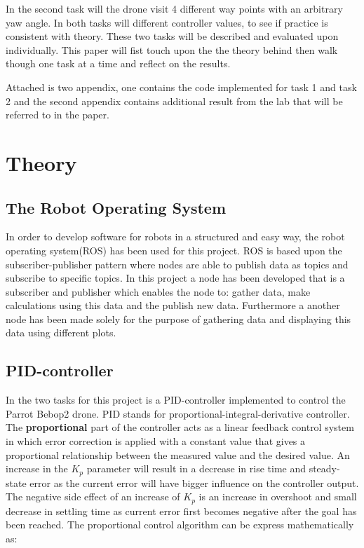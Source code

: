 \documentclass[conference]{IEEEtran}
\begin{document}
In the second task will the drone visit 4 different way points with an arbitrary yaw angle.  
In both tasks will different controller values, to see if practice is consistent with theory. These two tasks will be described and evaluated upon individually. This paper will fist touch upon the the theory behind then walk though one task at a time and reflect on the results.

Attached is two appendix, one contains the code implemented for task 1 and task 2 and the second appendix contains additional result from the lab that will be referred to in the paper.   

\section{Theory}\label{theory}
\subsection{The Robot Operating System}
In order to develop software for robots in a structured and easy way, the robot operating system(ROS)\cite{ros} has been used for this project. ROS is based upon the subscriber-publisher pattern where nodes are able to publish data as topics and subscribe to specific topics. In this project a node has been developed that is a subscriber and publisher which enables the node to: gather data, make calculations using this data and the publish new data. Furthermore a another node has been made solely for the purpose of gathering data and displaying this data using different plots.

\subsection{PID-controller}
In the two tasks for this project is a PID-controller implemented to control the Parrot Bebop2 drone. PID stands for proportional-integral-derivative controller. The \textbf{proportional} part of the controller acts as a linear feedback control system in which error correction is applied with a constant value that gives a proportional relationship between the measured value and the desired value. An increase in the $K_p$ parameter will result in a decrease in rise time and steady-state error as the current error will have bigger influence on the controller output. The negative side effect of an increase of $K_p$ is an increase in overshoot and small decrease in settling time as current error first becomes negative after the goal has been reached. The proportional control algorithm can be express mathematically as:
\end{document}

